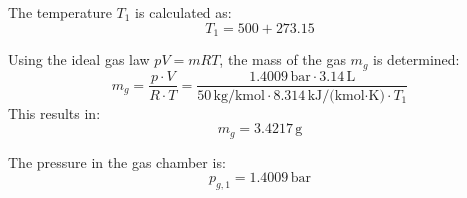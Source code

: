The temperature \( T_1 \) is calculated as:  
\[
T_1 = 500 + 273.15
\]  

Using the ideal gas law \( pV = mRT \), the mass of the gas \( m_g \) is determined:  
\[
m_g = \frac{p \cdot V}{R \cdot T} = \frac{1.4009 \, \text{bar} \cdot 3.14 \, \text{L}}{50 \, \text{kg/kmol} \cdot 8.314 \, \text{kJ/(kmol·K)} \cdot T_1}
\]  
This results in:  
\[
m_g = 3.4217 \, \text{g}
\]  

The pressure in the gas chamber is:  
\[
p_{g,1} = 1.4009 \, \text{bar}
\]